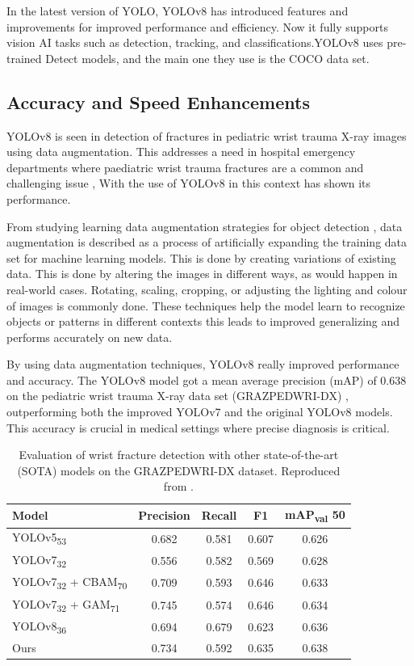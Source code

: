 \documentclass[11pt,journal,compsoc]{IEEEtran}
\begin{document}
In the latest version of YOLO, YOLOv8 has introduced features and improvements for improved performance and efficiency. Now it fully supports vision AI tasks such as detection, tracking, and classifications.YOLOv8 uses pre-trained Detect models, and the main one they use is the COCO data set.\cite{ultralytics2023models}

\subsection{Accuracy and Speed Enhancements}
YOLOv8 is seen in detection of fractures in pediatric wrist trauma X-ray images using data augmentation. This addresses a need in hospital emergency departments where paediatric wrist trauma fractures are a common and challenging issue , With the use of YOLOv8  in this context has shown its performance.

From studying learning data augmentation strategies for object detection \cite{zoph2020learning}, data augmentation is described as a process of artificially expanding the training data set for machine learning models. This is done by creating variations of existing data. This is done by altering the images in different ways, as would happen in real-world cases. Rotating, scaling, cropping, or adjusting the lighting and colour of images is commonly done. These techniques help the model learn to recognize objects or patterns in different contexts this leads to improved generalizing and performs accurately on new data.

By using data augmentation techniques, YOLOv8 really improved performance and accuracy. The YOLOv8 model got a mean average precision (mAP) of 0.638 on the pediatric wrist trauma X-ray data set (GRAZPEDWRI-DX) \cite{ju2023fracture}, outperforming both the improved YOLOv7 and the original YOLOv8 models. This accuracy is crucial in medical settings where precise diagnosis is critical.

\begin{table}[ht]
\centering
\caption{Evaluation of wrist fracture detection with other state-of-the-art (SOTA) models on the GRAZPEDWRI-DX dataset. Reproduced  from \cite{ju2023fracture}.}
\label{tab:wrist_fracture_detection}
\begin{tabular}{lcccc}
\hline
\textbf{Model} & \textbf{Precision} & \textbf{Recall} & \textbf{F1} & \textbf{mAP\textsubscript{val} 50} \\
\hline
YOLOv5\textsubscript{53} & 0.682 & 0.581 & 0.607 & 0.626 \\
YOLOv7\textsubscript{32} & 0.556 & 0.582 & 0.569 & 0.628 \\
YOLOv7\textsubscript{32} + CBAM\textsubscript{70} & 0.709 & 0.593 & 0.646 & 0.633 \\
YOLOv7\textsubscript{32} + GAM\textsubscript{71} & 0.745 & 0.574 & 0.646 & 0.634 \\
YOLOv8\textsubscript{36} & 0.694 & 0.679 & 0.623 & 0.636 \\
Ours & 0.734 & 0.592 & 0.635 & 0.638 \\
\hline
\end{tabular}
\end{table}
\end{document}
